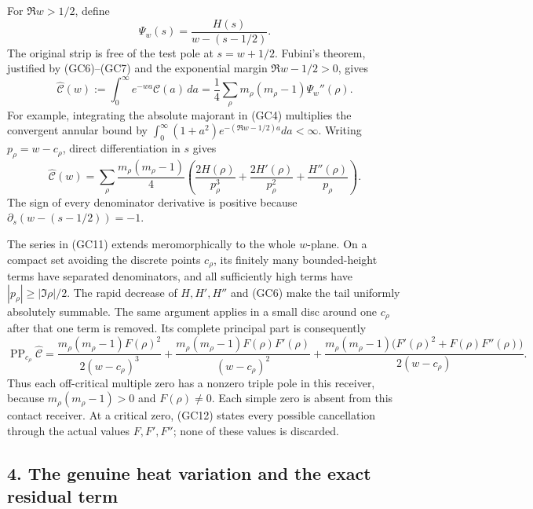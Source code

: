 \documentclass[
  10pt,
  a4paper,
]{article}
\begin{document}
For \(\Re w>1/2\), define \[
\Psi_w(s)=\frac{H(s)}{w-(s-1/2)}.
\tag{GC9}
\] The original strip is free of the test pole at \(s=w+1/2\). Fubini's
theorem, justified by (GC6)--(GC7) and the exponential margin
\(\Re w-1/2>0\), gives \[
\widehat{\mathcal C}(w)
:=\int_0^\infty e^{-wa}\mathcal C(a)\,da
=\frac14\sum_\rho m_\rho(m_\rho-1)\Psi_w''(\rho).
\tag{GC10}
\] For example, integrating the absolute majorant in (GC4) multiplies
the convergent annular bound by
\(\int_0^\infty(1+a^2)e^{-(\Re w-1/2)a}da<\infty\). Writing
\(p_\rho=w-c_\rho\), direct differentiation in \(s\) gives \[
\widehat{\mathcal C}(w)=
\sum_\rho\frac{m_\rho(m_\rho-1)}4
\left(
\frac{2H(\rho)}{p_\rho^3}
+\frac{2H'(\rho)}{p_\rho^2}
+\frac{H''(\rho)}{p_\rho}
\right).
\tag{GC11}
\] The sign of every denominator derivative is positive because
\(\partial_s(w-(s-1/2))=-1\).

The series in (GC11) extends meromorphically to the whole \(w\)-plane.
On a compact set avoiding the discrete points \(c_\rho\), its finitely
many bounded-height terms have separated denominators, and all
sufficiently high terms have \(|p_\rho|\ge|\Im\rho|/2\). The rapid
decrease of \(H,H',H''\) and (GC6) make the tail uniformly absolutely
summable. The same argument applies in a small disc around one
\(c_\rho\) after that one term is removed. Its complete principal part
is consequently \[
\boxed{
\operatorname{PP}_{c_\rho}\widehat{\mathcal C}
=
\frac{m_\rho(m_\rho-1)F(\rho)^2}{2(w-c_\rho)^3}
+\frac{m_\rho(m_\rho-1)F(\rho)F'(\rho)}{(w-c_\rho)^2}
+\frac{m_\rho(m_\rho-1)
\bigl(F'(\rho)^2+F(\rho)F''(\rho)\bigr)}
{2(w-c_\rho)}.}
\tag{GC12}
\] Thus each off-critical multiple zero has a nonzero triple pole in
this receiver, because \(m_\rho(m_\rho-1)>0\) and \(F(\rho)\ne0\). Each
simple zero is absent from this contact receiver. At a critical zero,
(GC12) states every possible cancellation through the actual values
\(F,F',F''\); none of these values is discarded.

\subsection{4. The genuine heat variation and the exact residual
term}\label{the-genuine-heat-variation-and-the-exact-residual-term}
\end{document}
